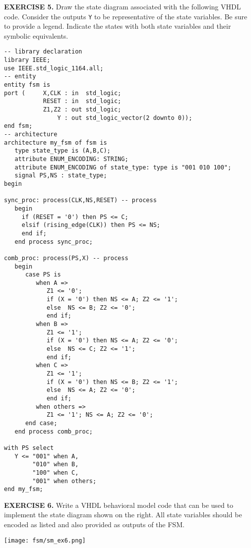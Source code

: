 \vspace{20pt}
\noindent
\begin{minipage}{1\textwidth}
\textbf{EXERCISE 5.}
Draw the state diagram associated with the following VHDL code. Consider the outputs \texttt{Y} to be representative of the state variables. Be sure to provide a legend. Indicate the states with both state variables and their symbolic equivalents.
\end{minipage}
\begin{minipage}{1\textwidth}
\vspace{10px}
\begin{lstlisting}
-- library declaration
library IEEE;
use IEEE.std_logic_1164.all;
-- entity
entity fsm is 
port (     X,CLK : in  std_logic; 
           RESET : in  std_logic; 
           Z1,Z2 : out std_logic;  
               Y : out std_logic_vector(2 downto 0)); 
end fsm;
-- architecture
architecture my_fsm of fsm is
   type state_type is (A,B,C);
   attribute ENUM_ENCODING: STRING; 
   attribute ENUM_ENCODING of state_type: type is "001 010 100";
   signal PS,NS : state_type;
begin

sync_proc: process(CLK,NS,RESET) -- process
   begin
     if (RESET = '0') then PS <= C; 
     elsif (rising_edge(CLK)) then PS <= NS; 
     end if; 
   end process sync_proc; 

comb_proc: process(PS,X) -- process
   begin
      case PS is 
         when A =>    
            Z1 <= '0';  
            if (X = '0') then NS <= A; Z2 <= '1';   
            else  NS <= B; Z2 <= '0';
            end if; 
         when B =>    
            Z1 <= '1';  
            if (X = '0') then NS <= A; Z2 <= '0';  
            else  NS <= C; Z2 <= '1'; 
            end if; 
         when C =>    
            Z1 <= '1';  
            if (X = '0') then NS <= B; Z2 <= '1'; 
            else  NS <= A; Z2 <= '0'; 
            end if; 
         when others =>    
            Z1 <= '1'; NS <= A; Z2 <= '0';  
      end case; 
   end process comb_proc; 
 
with PS select
   Y <= "001" when A, 
        "010" when B, 
        "100" when C, 
        "001" when others; 
end my_fsm;
\end{lstlisting}
\end{minipage}

\vspace{20pt}
\noindent
\begin{minipage}[t]{0.5\textwidth}
\textbf{EXERCISE 6.}
Write a VHDL behavioral model code that can be used to implement the state diagram shown on the right. All state variables should be encoded as listed and also provided as outputs of the FSM.
\end{minipage}
\begin{minipage}[t]{0.47\textwidth}
\vspace{0pt}\raggedright
\centering
\texttt{[image: fsm/sm\_ex6.png]}
\end{minipage}

